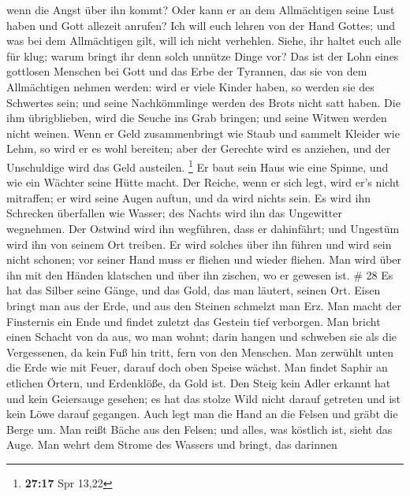 wenn die Angst über ihn kommt?  Oder kann er an dem
Allmächtigen seine Lust haben und Gott allezeit anrufen? 
Ich will euch lehren von der Hand Gottes; und was bei dem Allmächtigen
gilt, will ich nicht verhehlen.  Siehe, ihr haltet euch
alle für klug; warum bringt ihr denn solch unnütze Dinge vor?
 Das ist der Lohn eines gottlosen Menschen bei Gott und das
Erbe der Tyrannen, das sie von dem Allmächtigen nehmen werden:
 wird er viele Kinder haben, so werden sie des Schwertes
sein; und seine Nachkömmlinge werden des Brots nicht satt haben.
 Die ihm übrigblieben, wird die Seuche ins Grab bringen;
und seine Witwen werden nicht weinen.  Wenn er Geld
zusammenbringt wie Staub und sammelt Kleider wie Lehm,  so
wird er es wohl bereiten; aber der Gerechte wird es anziehen, und der
Unschuldige wird das Geld austeilen. \footnote{\textbf{27:17} Spr 13,22}
 Er baut sein Haus wie eine Spinne, und wie ein Wächter
seine Hütte macht.  Der Reiche, wenn er sich legt, wird
er's nicht mitraffen; er wird seine Augen auftun, und da wird nichts
sein.  Es wird ihn Schrecken überfallen wie Wasser; des
Nachts wird ihn das Ungewitter wegnehmen.  Der Ostwind wird
ihn wegführen, dass er dahinfährt; und Ungestüm wird ihn von seinem Ort
treiben.  Er wird solches über ihn führen und wird sein
nicht schonen; vor seiner Hand muss er fliehen und wieder fliehen.
 Man wird über ihn mit den Händen klatschen und über ihn
zischen, wo er gewesen ist. \# 28  Es hat das Silber seine
Gänge, und das Gold, das man läutert, seinen Ort.  Eisen
bringt man aus der Erde, und aus den Steinen schmelzt man Erz.
 Man macht der Finsternis ein Ende und findet zuletzt das
Gestein tief verborgen.  Man bricht einen Schacht von da
aus, wo man wohnt; darin hangen und schweben sie als die Vergessenen, da
kein Fuß hin tritt, fern von den Menschen.  Man zerwühlt
unten die Erde wie mit Feuer, darauf doch oben Speise wächst.
 Man findet Saphir an etlichen Örtern, und Erdenklöße, da
Gold ist.  Den Steig kein Adler erkannt hat und kein
Geiersauge gesehen;  es hat das stolze Wild nicht darauf
getreten und ist kein Löwe darauf gegangen.  Auch legt man
die Hand an die Felsen und gräbt die Berge um.  Man reißt
Bäche aus den Felsen; und alles, was köstlich ist, sieht das Auge.
 Man wehrt dem Strome des Wassers und bringt, das darinnen
